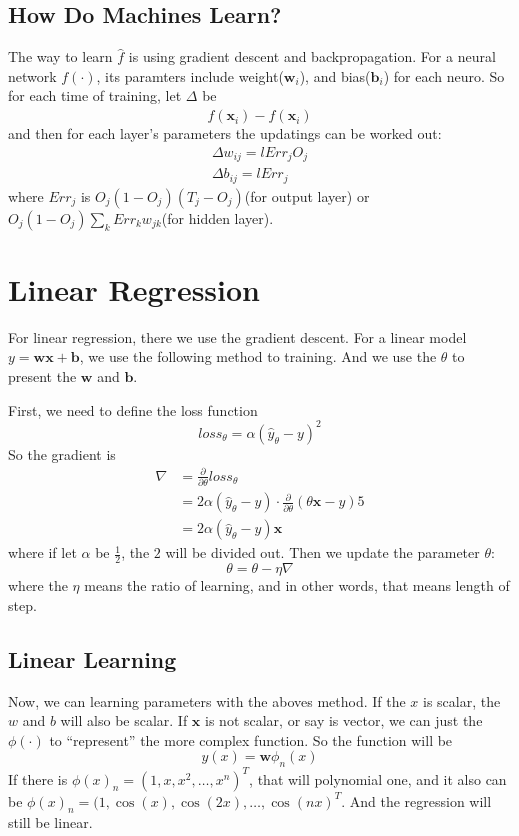 \documentclass{article}
\begin{document}
\subsection{How Do Machines Learn?}
\label{sec:nn:how}

The way to learn $\hat{f}$ is using gradient descent and backpropagation.
For a neural network $f(\cdot)$, its paramters include weight($\mathbf{w}_i$),
and bias($\mathbf{b}_i$) for each neuro. So for each time of training, 
let $\Delta$ be
$$
 f(\mathbf{x}_i) - \hat{f}(\mathbf{x}_i)
$$
and then for each layer's parameters the updatings can be worked out:
\begin{align*}
  \Delta w_{ij} = l{Err_jO_j} \\
  \Delta b_{ij} = l{Err_j}
\end{align*}
where $Err_j$ is $O_j(1-O_j)(T_j-O_j)$(for output layer) or $O_j(1-O_j)\sum\limits_kErr_kw_{jk}$(for hidden layer).


\section{Linear Regression}
\label{sec:lreg}

For linear regression, there we use the gradient descent.
For a linear model $y=\mathbf{w}\mathbf{x}+\mathbf{b}$, we use the following method to training.
And we use the $\theta$ to present the $\mathbf{w}$ and $\mathbf{b}$.

First, we need  to define the loss function
\[
loss_\theta = \alpha(\hat{y}_\theta - y)^2
\]
So the gradient is
\begin{align*}
\nabla &= \frac{\partial}{\partial \theta}loss_\theta \\
       &= 2\alpha (\hat{y}_\theta -y)\cdot \frac{\partial}{\partial \theta}\left(\theta \mathbf{x} - y\right) 5 \\
       &= 2\alpha(\hat{y}_\theta -y)\mathbf{x}
\end{align*}
where if let $\alpha$ be $\frac{1}{2}$, the $2$ will be divided out.
Then we update the parameter $\theta$:
\[
\theta = \theta - \eta\nabla
\]
where the $\eta$ means the ratio of learning, and in other words, that means length of step.

\subsection{Linear Learning}
\label{sec:lreg:how}

Now, we can learning parameters with the aboves method.
If the $x$ is scalar, the $w$ and $b$ will also be scalar. If $\mathbf{x}$ is not scalar, or say is vector,
we can just the $\phi(\cdot)$ to ``represent'' the more complex function.
So the function will be 
\[
y(x) = \mathbf{w}\phi_n(x)
\]
If there is $\phi(x)_n = (1,x,x^2,\dots,x^n)^T$, that will polynomial one, and it also can be $\phi(x)_n = (1,\cos(x),\cos(2x),\dots,\cos(nx)^T$.
And the regression will still be linear.
\end{document}

